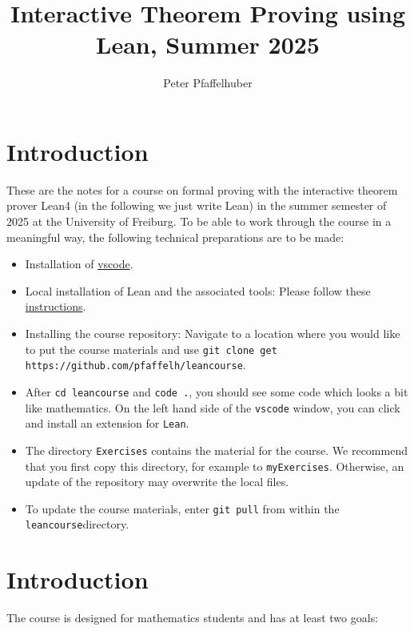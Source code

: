 \documentclass{memoir}
\title{\sffamily Interactive Theorem Proving using Lean, Summer 2025}
\author{\sffamily Peter Pfaffelhuber}
\date{\sffamily }
\begin{document}
\frontmatter

\begin{titlingpage}
\maketitle
\end{titlingpage}

\tableofcontents

\mainmatter

\chapter*{Introduction}
These are the notes for a course on formal proving with the interactive theorem prover Lean4 (in the following we just write Lean) in the summer semester of 2025 at the University of Freiburg. To be able to work through the course in a meaningful way, the following technical preparations are to be made:
\begin{itemize}
\item Installation of \hyperlink{"https://code.visualstudio.com/"}{vscode}.\item Local installation of Lean and the associated tools: Please follow these \hyperlink{"https://github.com/leanprover-community/mathlib4/wiki/Using-mathlib4-as-a-dependency"}{instructions}.\item Installing the course repository: Navigate to a location where you would like to put the course materials and use \Verb|git clone get https://github.com/pfaffelh/leancourse|.\item After \Verb|cd leancourse| and \Verb|code .|, you should see some code which looks a bit like mathematics. On the left hand side of the \Verb|vscode| window, you can click and install an extension for \Verb|Lean|.\item The directory \Verb|Exercises| contains the material for the course. We recommend that you first copy this directory, for example to \Verb|myExercises|. Otherwise, an update of the repository may overwrite the local files.\item To update the course materials, enter \Verb|git pull| from within the \Verb|leancourse|directory.
\end{itemize}

\chapter{Introduction}

The course is designed for mathematics students and has at least two goals:
\end{document}
